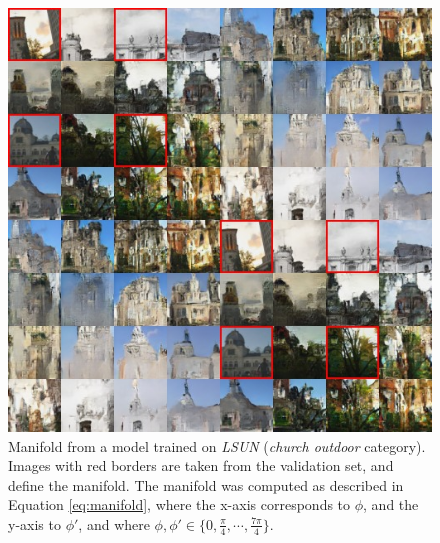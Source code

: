 \documentclass{article}
\begin{document}
\begin{figure}[H]
\vspace{80pt}
    \centering \includegraphics[width=1.\textwidth]{church_manifold_highlight.jpg}
    \caption{Manifold from a model trained on \emph{LSUN} (\emph{church outdoor} category). Images with red borders are taken from the validation set, and define the manifold. The manifold was computed as described in Equation \ref{eq:manifold}, where the x-axis corresponds to $\phi$, and the y-axis to $\phi'$, and where $\phi, \phi' \in \{0, \frac{\pi}{4}, \cdots, \frac{7\pi}{4}\}$. }
\end{figure}
\end{document}
